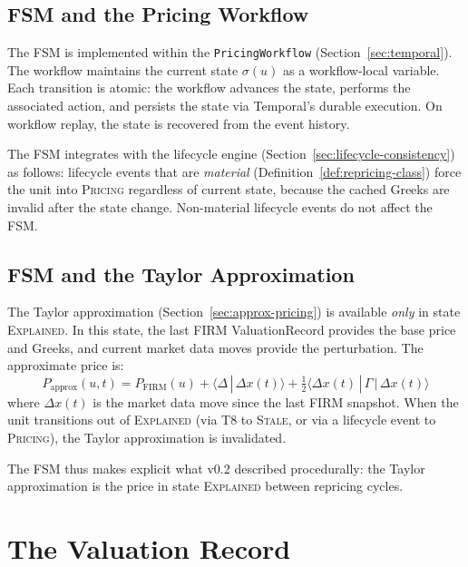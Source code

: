 \documentclass[11pt,a4paper]{article}
\begin{document}
\subsection{FSM and the Pricing Workflow}

The FSM is implemented within the \texttt{PricingWorkflow} (Section~\ref{sec:temporal}).  The workflow maintains the current state $\sigma(u)$ as a workflow-local variable.  Each transition is atomic: the workflow advances the state, performs the associated action, and persists the state via Temporal's durable execution.  On workflow replay, the state is recovered from the event history.

The FSM integrates with the lifecycle engine (Section~\ref{sec:lifecycle-consistency}) as follows: lifecycle events that are \emph{material} (Definition~\ref{def:repricing-class}) force the unit into \textsc{Pricing} regardless of current state, because the cached Greeks are invalid after the state change.  Non-material lifecycle events do not affect the FSM.

\subsection{FSM and the Taylor Approximation}

The Taylor approximation (Section~\ref{sec:approx-pricing}) is available \emph{only} in state \textsc{Explained}.  In this state, the last FIRM ValuationRecord provides the base price and Greeks, and current market data moves provide the perturbation.  The approximate price is:
\[
P_{\mathrm{approx}}(u, t) = P_{\mathrm{FIRM}}(u) + \langle \Delta \,|\, \Delta x(t) \rangle + \tfrac{1}{2}\langle \Delta x(t) \,|\, \Gamma \,|\, \Delta x(t) \rangle
\]
where $\Delta x(t)$ is the market data move since the last FIRM snapshot.  When the unit transitions out of \textsc{Explained} (via T8 to \textsc{Stale}, or via a lifecycle event to \textsc{Pricing}), the Taylor approximation is invalidated.

The FSM thus makes explicit what v0.2 described procedurally: the Taylor approximation is the price in state \textsc{Explained} between repricing cycles.

\clearpage
\section{The Valuation Record}
\label{sec:valuation-record}
\end{document}
